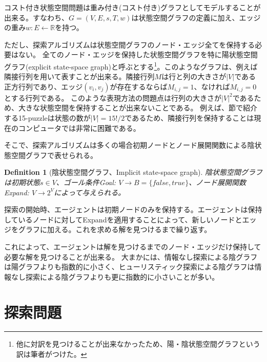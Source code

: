 \documentclass{book}
\newtheorem{definition}{Definition}
\begin{document}
コスト付き状態空間問題は重み付き(コスト付き)グラフとしてモデルすることが出来る。すなわち、$G = (V, E, s, T, w)$は状態空間グラフの定義に加え、エッジの重み$w: E \leftarrow \mathbb{R}$を持つ。

ただし、探索アルゴリズムは状態空間グラフのノード・エッジ全てを保持する必要はない。
全てのノード・エッジを保持した状態空間グラフを特に陽状態空間グラフ(explicit state-space graph)と呼ぶとする\footnote{他に対訳を見つけることが出来なかったため、陽・陰状態空間グラフという訳は筆者がつけた。}。このようなグラフは、例えば隣接行列を用いて表すことが出来る。隣接行列$M$は行と列の大きさが$|V|$である正方行列であり、エッジ$(v_i, v_j)$が存在するならば$M_{i,j}=1$、なければ$M_{i,j}=0$とする行列である。
このような表現方法の問題点は行列の大きさが$|V|^2$であるため、大きな状態空間を保持することが出来ないことである。
例えば、節で紹介する15-puzzleは状態の数が$|V|=15!/2$であるため、隣接行列を保持することは現在のコンピュータでは非常に困難である。

そこで、探索アルゴリズムは多くの場合初期ノードとノード展開関数による陰状態空間グラフで表せられる。

\begin{definition}[陰状態空間グラフ、Implicit state-space graph]
陰状態空間グラフは初期状態$s \in V$、ゴール条件Goal: $V \rightarrow B = \{false, true\}$、ノード展開関数Expand: $V \rightarrow 2^V$によって与えられる。
\end{definition}

探索の開始時、エージェントは初期ノードのみを保持する。エージェントは保持しているノードに対してExpandを適用することによって、新しいノードとエッジをグラフに加える。これを求める解を見つけるまで繰り返す。



これによって、エージェントは解を見つけるまでのノード・エッジだけ保持して必要な解を見つけることが出来る。
大まかには、情報なし探索による陰グラフは陽グラフよりも指数的に小さく、ヒューリスティック探索による陰グラフは情報なし探索による陰グラフよりも更に指数的に小さいことが多い。


\section{探索問題}
\label{sec:search-problem}
\end{document}
